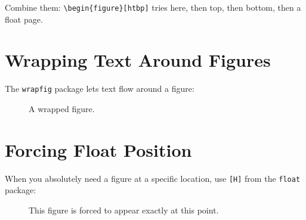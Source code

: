 \documentclass[12pt]{article}
\begin{document}
Combine them: \verb|\begin{figure}[htbp]| tries here, then top, then bottom,
then a float page.

\section{Wrapping Text Around Figures}

The \texttt{wrapfig} package lets text flow around a figure:

\begin{figure}
    \centering
    \caption{A wrapped figure.}
    \label{fig:wrapped}
\end{figure}

\lipsum[1]

\section{Forcing Float Position}

When you absolutely need a figure at a specific location, use \verb|[H]|
from the \texttt{float} package:

\begin{figure}[H]
\centering
{}
\caption{This figure is forced to appear exactly at this point.}
\label{fig:forced}
\end{figure}

\lipsum[2]
\end{document}
